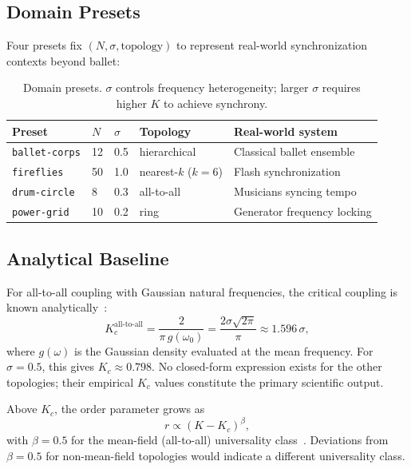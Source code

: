 \documentclass[11pt]{article}
\begin{document}
\subsection{Domain Presets}

Four presets fix $(N, \sigma, \text{topology})$ to represent real-world synchronization
contexts beyond ballet:

\begin{table}[h]
\centering
\small
\caption{Domain presets. $\sigma$ controls frequency heterogeneity; larger $\sigma$
  requires higher $K$ to achieve synchrony.}
\label{tab:presets}
\begin{tabular}{lllll}
\toprule
\textbf{Preset} & \textbf{$N$} & \textbf{$\sigma$} & \textbf{Topology} &
  \textbf{Real-world system} \\
\midrule
\texttt{ballet-corps} & 12 & 0.5 & hierarchical & Classical ballet ensemble \\
\texttt{fireflies}    & 50 & 1.0 & nearest-$k$ ($k=6$) & Flash synchronization \\
\texttt{drum-circle}  &  8 & 0.3 & all-to-all & Musicians syncing tempo \\
\texttt{power-grid}   & 10 & 0.2 & ring & Generator frequency locking \\
\bottomrule
\end{tabular}
\end{table}

\subsection{Analytical Baseline}

For all-to-all coupling with Gaussian natural frequencies, the critical coupling is
known analytically~\cite{strogatz2000kuramoto}:
\begin{equation}
  K_c^{\text{all-to-all}} = \frac{2}{\pi\, g(\omega_0)}
    = \frac{2\sigma\sqrt{2\pi}}{\pi} \approx 1.596\,\sigma,
  \label{eq:kc_analytic}
\end{equation}
where $g(\omega)$ is the Gaussian density evaluated at the mean frequency. For
$\sigma = 0.5$, this gives $K_c \approx 0.798$. No closed-form expression exists for
the other topologies; their empirical $K_c$ values constitute the primary scientific
output.

Above $K_c$, the order parameter grows as
\begin{equation}
  r \propto (K - K_c)^\beta,
  \label{eq:critical_exponent}
\end{equation}
with $\beta = 0.5$ for the mean-field (all-to-all) universality class~\cite{acebron2005kuramoto}.
Deviations from $\beta = 0.5$ for non-mean-field topologies would indicate a different
universality class.
\end{document}
